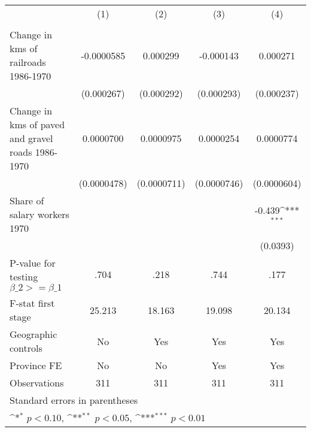 {
\def\sym#1{\ifmmode^{#1}\else\(^{#1}\)\fi}
\begin{tabular}{l*{4}{c}}
\hline\hline
                &\multicolumn{1}{c}{(1)}&\multicolumn{1}{c}{(2)}&\multicolumn{1}{c}{(3)}&\multicolumn{1}{c}{(4)}\\
                &\multicolumn{1}{c}{}&\multicolumn{1}{c}{}&\multicolumn{1}{c}{}&\multicolumn{1}{c}{}\\
\hline
Change in kms of railroads 1986-1970&-0.0000585         & 0.000299         &-0.000143         & 0.000271         \\
                &(0.000267)         &(0.000292)         &(0.000293)         &(0.000237)         \\
[1em]
Change in kms of paved and gravel roads 1986-1970&0.0000700         &0.0000975         &0.0000254         &0.0000774         \\
                &(0.0000478)         &(0.0000711)         &(0.0000746)         &(0.0000604)         \\
[1em]
Share of salary workers 1970&                  &                  &                  &   -0.439\sym{***}\\
                &                  &                  &                  & (0.0393)         \\
\hline
P-value for testing $\beta\_{2} >= \beta\_{1}$&     .704         &     .218         &     .744         &     .177         \\
F-stat first stage&   25.213         &   18.163         &   19.098         &   20.134         \\
Geographic controls&       No         &      Yes         &      Yes         &      Yes         \\
Province FE     &       No         &       No         &      Yes         &      Yes         \\
Observations    &      311         &      311         &      311         &      311         \\
\hline\hline
\multicolumn{5}{l}{\footnotesize Standard errors in parentheses}\\
\multicolumn{5}{l}{\footnotesize \sym{*} \(p<0.10\), \sym{**} \(p<0.05\), \sym{***} \(p<0.01\)}\\
\end{tabular}
}

